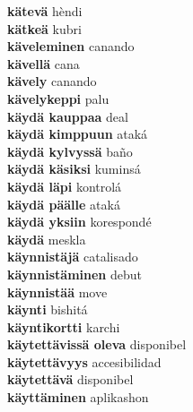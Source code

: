 \textbf{ kätevä  } hèndi \\
\textbf{ kätkeä  } kubri \\
\textbf{ käveleminen  } canando \\
\textbf{ kävellä  } cana \\
\textbf{ kävely  } canando \\
\textbf{ kävelykeppi  } palu \\
\textbf{ käydä kauppaa  } deal \\
\textbf{ käydä kimppuun  } ataká \\
\textbf{ käydä kylvyssä  } baño \\
\textbf{ käydä käsiksi  } kuminsá \\
\textbf{ käydä läpi  } kontrolá \\
\textbf{ käydä päälle  } ataká \\
\textbf{ käydä yksiin  } korespondé \\
\textbf{ käydä  } meskla \\
\textbf{ käynnistäjä  } catalisado \\
\textbf{ käynnistäminen  } debut \\
\textbf{ käynnistää  } move \\
\textbf{ käynti  } bishitá \\
\textbf{ käyntikortti  } karchi \\
\textbf{ käytettävissä oleva  } disponibel \\
\textbf{ käytettävyys  } accesibilidad \\
\textbf{ käytettävä  } disponibel \\
\textbf{ käyttäminen  } aplikashon \\
